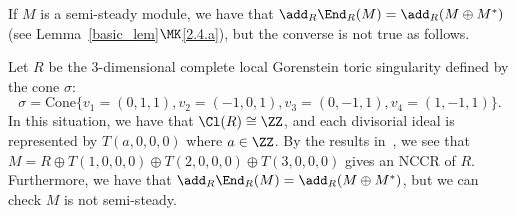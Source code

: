 \begin{exem}
\begin{center}
{{ }}
\end{center}
\end{exem}


\begin{exem}\label{ex3}
If $M$ is a semi-steady module, we have that $\add_R\End_R(M)=\add_R(M\oplus M^*)$ (see Lemma~\ref{basic_lem}$\MK$\eqref{2.4.a}), but the converse is not true as follows.

Let $R$ be the $3$-dimensional complete local Gorenstein toric singularity defined by the cone $\sigma$:
\[
\sigma=\mathrm{Cone}\{v_1=(0,1,1), v_2=(-1,0,1), v_3=(0,-1,1), v_4=(1,-1,1) \}.
\]
In this situation, we have that $\Cl(R)\cong\ZZ$, and each divisorial ideal is represented by $T(a,0,0,0)$ where $a\in\ZZ$. By the results in~\cite[Subsection~5.3]{Nak}, we see that $M=R\oplus T(1,0,0,0)\oplus T(2,0,0,0)\oplus T(3,0,0,0)$ gives an NCCR of $R$. Furthermore, we have that $\add_R\End_R(M)=\add_R(M\oplus M^*)$, but we can check $M$ is not semi-steady.
\end{exem}

